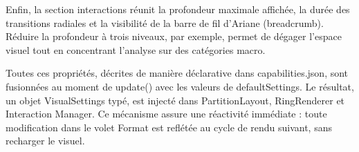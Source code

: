 Enfin, la section interactions réunit la profondeur maximale affichée, la durée des transitions radiales et la visibilité de la barre de fil d’Ariane (breadcrumb). Réduire la profondeur à trois niveaux, par exemple, permet de dégager l’espace visuel tout en concentrant l’analyse sur des catégories macro. 

Toutes ces propriétés, décrites de manière déclarative dans capabilities.json, sont fusionnées au moment de update() avec les valeurs de defaultSettings. Le résultat, un objet VisualSettings typé, est injecté dans PartitionLayout, RingRenderer et Interaction Manager. Ce mécanisme assure une réactivité immédiate : toute modification dans le volet Format est reflétée au cycle de rendu suivant, sans recharger le visuel.



